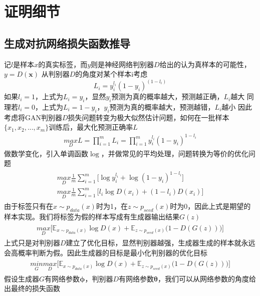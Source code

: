 \chapter{证明细节}
\section{生成对抗网络损失函数推导}
记$l$是样本$x$的真实标签，而$y$则是神经网络判别器$D$给出的认为真样本的可能性，$y=D(\mathbf{x})$
从判别器$D$的角度对某个样本i考虑
$$L_i=y_i^{l_i}(1-y_i)^{(1-l_i)}$$
如果$l_i=1$，上式为$L_i=y_i$，显然$y_i$预测为真的概率越大，预测越正确，$L_i$越大
同理若$l_i=0$，上式为$L_i=1-y_i$，$y_i$预测为真的概率越大，预测越错，$L_i$越小
因此考虑将GAN判别器$D$损失问题转变为极大似然估计问题，如何在一批样本$\{x_1,x_2,...,x_m\}$训练后，最大化预测正确率$L$
\begin{align*}
        \underset{D}{max}L=\prod_{i=1}^mL_i=\prod_{i=1}^my_i^{l_i}(1-y_i)^{1-l_i}
\end{align*}
做数学变化，引入单调函数$\log$，并做常见的平均处理，问题转换为等价的优化问题
\begin{align*}
    \begin{split}
        \underset{D}{max}\frac{1}{m}\sum_{i=1}^m\Big[\log y_i^{l_i}+\log(1-y_i)^{1-l_i}\Big] \\
        \underset{D}{max}\frac{1}{m}\sum_{i=1}^m\Big[l_i\log D(x_i)+(1-l_i)D(x_i)\Big]
    \end{split}
\end{align*}
由于标签只有在$x\sim p_{data}(x)$时为1，在$z\sim p_{seed}(x)$时为0，因此上式是期望的样本实现。我们将标签为假的样本写成有生成器输出结果$G(z)$
\begin{align*}
    \begin{split}
        \underset{D}{max}\Big[\mathbb{E}_{x\sim p_{data}(x)}\log D(x)+\mathbb{E}_{z\sim p_{seed}(x)}\big(1-D(G(z))\big)\Big]
    \end{split}
\end{align*}
上式只是对判别器$D$建立了优化目标，显然判别器越强，生成器生成的样本就永远会高概率判断为假。因此生成器的目标是最小化判别器的优化目标
\begin{align*}
    \begin{split}
        \underset{G}{min}\underset{D}{max}\Big[\mathbb{E}_{x\sim p_{data}(x)}\log D(x)+\mathbb{E}_{z\sim p_{seed}(x)}\big(1-D(G(z))\big)\Big]
    \end{split}
\end{align*}
假设生成器$G$有网络参数$\mathbf{\phi}$，判别器$D$有网络参数$\mathbf{\theta}$，我们可以从网络参数的角度给出最终的损失函数

